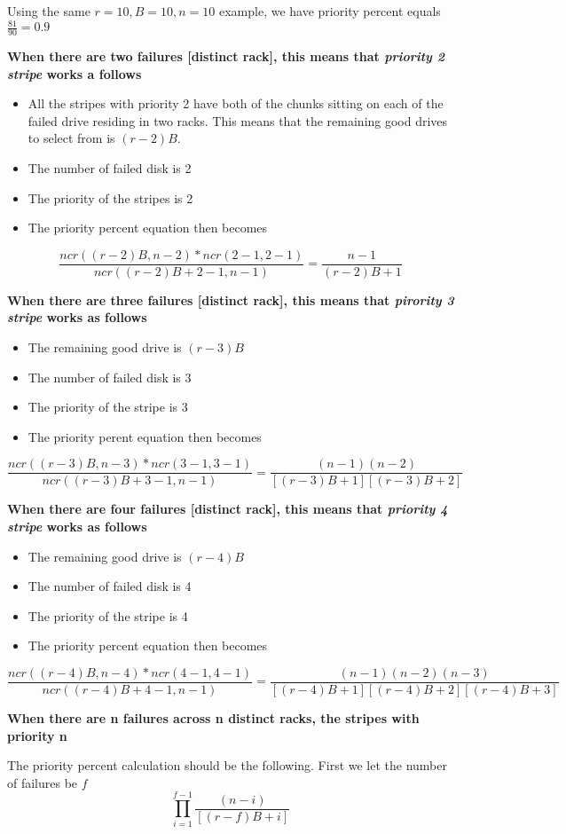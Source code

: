 \documentclass[journal]{IEEEtran}
\begin{document}
Using the same $r=10, B=10, n=10$ example, we have priority percent equals $\frac{81}{90}=0.9$

\textbf{When there are two failures [distinct rack], this means that \textit{priority 2 stripe} works a follows}
\begin{itemize}
  \item All the stripes with priority 2 have both of the chunks sitting on each of the failed drive residing in two racks. This means that the remaining good drives to select from is $(r-2)B$.
  \item The number of failed disk is 2
  \item The priority of the stripes is 2
  \item The priority percent equation then becomes
\end{itemize}

\begin{equation*}
  \frac{ncr((r-2)B, n-2)*ncr(2-1, 2-1)}{ncr((r-2)B+2-1, n-1)}=\frac{n-1}{(r-2)B+1}
\end{equation*}

\textbf{When there are three failures [distinct rack], this means that \textit{pirority 3 stripe} works as follows}
\begin{itemize}
  \item The remaining good drive is $(r-3)B$
  \item The number of failed disk is 3
  \item The priority of the stripe is 3
  \item The priority perent equation then becomes
\end{itemize}

\begin{equation*}
  \frac{ncr((r-3)B, n-3)*ncr(3-1, 3-1)}{ncr((r-3)B+3-1, n-1)}=\frac{(n-1)(n-2)}{[(r-3)B+1][(r-3)B+2]}
\end{equation*}

\textbf{When there are four failures [distinct rack], this means that \textit{priority 4 stripe} works as follows}
\begin{itemize}
  \item The remaining good drive is $(r-4)B$
  \item The number of failed disk is 4
  \item The priority of the stripe is 4
  \item The priority percent equation then becomes
\end{itemize}

\begin{equation*}
  \frac{ncr((r-4)B, n-4)*ncr(4-1, 4-1)}{ncr((r-4)B+4-1, n-1)}=\frac{(n-1)(n-2)(n-3)}{[(r-4)B+1][(r-4)B+2][(r-4)B+3]}
\end{equation*}

\textbf{When there are n failures across n distinct racks, the stripes with priority n}

The priority percent calculation should be the following. First we let the number of failures be $f$
\begin{equation*}
  \prod_{i=1}^{f-1}\frac{(n-i)}{[(r-f)B+i]}
\end{equation*}

\newpage
\singlespacing 
\end{document}
